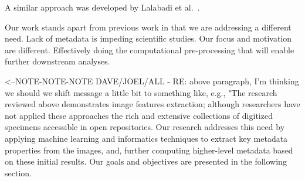 \documentclass[conference]{IEEEtran}
\begin{document}
A similar approach was developed by Lalabadi et al.~\cite{Lalabadi2020FishFC}.

Our work stands apart from previous work in that we are
addressing a different need. Lack of metadata is impeding scientific studies.
Our focus and motivation are different.
Effectively doing the computational pre-processing
that will enable further downstream analyses.

<--NOTE-NOTE-NOTE DAVE/JOEL/ALL - RE: above paragraph, I'm thinking we should we shift message a little bit to something like, e.g., "The research reviewed above demonstrates image features extraction; although researchers have not applied these approaches the rich and extensive collections of digitized specimens accessible in open repositories. Our research addresses this need by applying machine learning and informatics techniques to extract key metadata properties from the images, and, further computing higher-level metadata based on these initial results. Our goals and objectives are presented in the following section.



\end{document}
